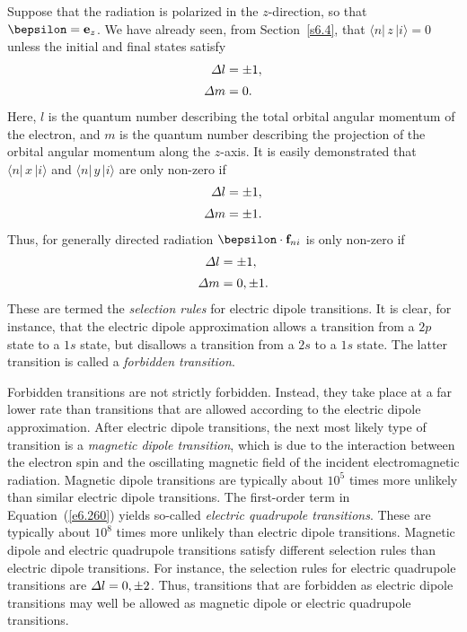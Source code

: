 Suppose that the radiation is polarized in the $z$-direction, 
so that $\bepsilon
= {\bf e}_z$. We have already seen, from Section~\ref{s6.4}, that 
$\langle n|\,z\,|i\rangle=0$ unless the initial and final states satisfy
\begin{align}
{\mit\Delta} l &= \pm 1,\\[0.5ex]
{\mit\Delta} m &= 0.
\end{align}
Here, $l$ is the quantum number describing the total orbital angular momentum of
the electron, and $m$ is the quantum number describing the projection of the
orbital angular momentum along the $z$-axis.
It is easily demonstrated that $\langle n|\,x\,|i \rangle $ and 
$\langle n|\,y\,|i\rangle $
are only non-zero if 
\begin{align}
{\mit\Delta} l &= \pm 1,\\[0.5ex]
{\mit\Delta} m &= \pm 1.
\end{align}
Thus, for generally directed radiation $\bepsilon\cdot{\bf f}_{ni}$ is only non-zero if
\begin{align}
{\mit\Delta} l &= \pm 1,\\[0.5ex]
{\mit\Delta} m &= 0, \pm 1.
\end{align}
These are termed the {\em selection rules}\/ for electric dipole transitions. It
is clear, for instance, that the electric dipole approximation allows
a transition from a $2p$ state to a $1s$ state, but disallows a transition
from a $2s$ to a $1s$ state. The latter transition is called a {\em forbidden
transition}. 

Forbidden transitions are not strictly forbidden. Instead, they  take
place at a far lower rate than transitions that are allowed 
according to  the electric
dipole approximation. 
After electric dipole transitions, the next most likely type of transition
is a {\em magnetic dipole transition}, which is due to the interaction between
the electron spin and the oscillating magnetic field of the
incident  electromagnetic
radiation. Magnetic dipole transitions are typically about $10^5$ times
more unlikely than similar electric dipole transitions. The first-order term
in Equation~(\ref{e6.260}) yields so-called {\em electric quadrupole transitions}.
These are typically about $10^8$ times more unlikely than electric
dipole transitions. Magnetic dipole and electric quadrupole transitions
satisfy different selection rules than  electric dipole transitions. For instance, the selection rules for electric quadrupole transitions
are ${\mit\Delta} l =0, \pm 2$. Thus, transitions that are forbidden as
electric dipole transitions may well be allowed as magnetic dipole
or electric quadrupole transitions.

